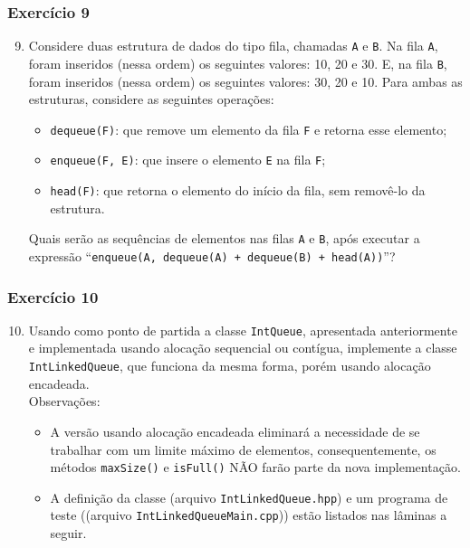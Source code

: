 \documentclass[aspectratio=169]{beamer}
\begin{document}
\begin{frame}[fragile]\frametitle{Exercício 9}
\begin{enumerate}
        \setcounter{enumi}{8}
	\item Considere duas estrutura de dados do tipo fila, chamadas \texttt{A} e \texttt{B}. Na fila \texttt{A}, foram inseridos (nessa ordem) os seguintes valores: 10, 20 e 30. E, na fila \texttt{B}, foram inseridos (nessa ordem) os seguintes valores: 30, 20 e 10. Para ambas as estruturas, considere as seguintes operações:
\begin{itemize}
	\item \texttt{dequeue(F)}: que remove um elemento da fila \texttt{F} e retorna esse elemento;
	\item \texttt{enqueue(F, E)}: que insere o elemento \texttt{E} na fila \texttt{F};
	\item \texttt{head(F)}: que retorna o elemento do início da fila, sem removê-lo da estrutura.
\end{itemize}
Quais serão as sequências de elementos nas filas \texttt{A} e \texttt{B}, após executar a expressão ``\texttt{enqueue(A, dequeue(A) + dequeue(B) + head(A))}''?
\end{enumerate}
\end{frame}

\begin{frame}[fragile]\frametitle{Exercício 10}
\begin{enumerate}
        \setcounter{enumi}{9}
	\item Usando como ponto de partida a classe \texttt{IntQueue}, apresentada anteriormente e implementada usando alocação sequencial ou contígua, implemente a classe \texttt{IntLinkedQueue}, que funciona da mesma forma, porém usando alocação encadeada.\\
	Observações:
	\begin{itemize}
		\item A versão usando alocação encadeada eliminará a necessidade de se trabalhar com um limite máximo de elementos, consequentemente, os métodos \texttt{maxSize()} e \texttt{isFull()} NÃO farão parte da nova implementação.
		\item A definição da classe (arquivo \texttt{IntLinkedQueue.hpp}) e um programa de teste ((arquivo \texttt{IntLinkedQueueMain.cpp})) estão listados nas lâminas a seguir.
	\end{itemize}
\end{enumerate}
\end{frame}
\end{document}
